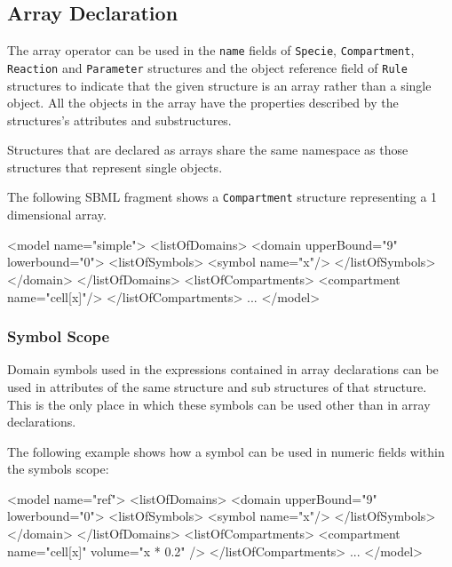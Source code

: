 \documentclass{cekarticle}
\begin{document}
\subsection{Array Declaration}

The array operator can be used in the \texttt{name} fields of
\texttt{Specie}, \texttt{Compartment}, \texttt{Reaction} and
\texttt{Parameter} structures and the object reference field of
\texttt{Rule} structures to indicate that the given structure is
an array rather than a single object. All the objects in the
array have the properties described by the structures's
attributes and substructures.

Structures that are declared as arrays share the same namespace
as those structures that represent single objects.

The following SBML fragment shows a \texttt{Compartment}
structure representing a 1 dimensional array.

\begin{example}
<model name="simple">
    <listOfDomains>
        <domain upperBound="9" lowerbound="0">
            <listOfSymbols>
                <symbol name="x"/>
            </listOfSymbols>
        </domain>
    </listOfDomains>
    <listOfCompartments>
        <compartment name="cell[x]"/>
    </listOfCompartments>
    ...
</model>
\end{example}

\subsubsection{Symbol Scope}

Domain symbols used in the expressions contained in array declarations
can be used in attributes of the same structure and sub
structures of that structure.  This is the only place in which
these symbols can be used other than in array declarations.

The following example shows how a symbol can be used in numeric
fields within the symbols scope:

\begin{example}
<model name="ref">
    <listOfDomains>
        <domain upperBound="9" lowerbound="0">
            <listOfSymbols>
                <symbol name="x"/>
            </listOfSymbols>
        </domain>
    </listOfDomains>
    <listOfCompartments>
        <compartment name="cell[x]" volume="x * 0.2" />
    </listOfCompartments>
    ...
</model>
\end{example}
\end{document}
